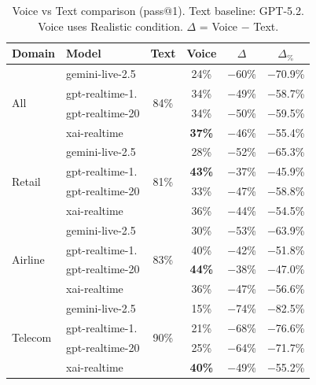 \begin{table}[h]
\caption{Voice vs Text comparison (pass@1). Text baseline: GPT-5.2. Voice uses Realistic condition. $\Delta$ = Voice $-$ Text.}
\label{tab:voice-vs-text}
\centering
\begin{small}
\begin{tabular}{@{}llcccc@{}}
\toprule
\textbf{Domain} & \textbf{Model} & \textbf{Text} & \textbf{Voice} & \textbf{$\Delta$} & \textbf{$\Delta_{\%}$} \\
\midrule
\multirow{4}{*}{All} & gemini-live-2.5 & \multirow{4}{*}{84\%} & 24\% & $-$60\% & $-$70.9\% \\
 & gpt-realtime-1. &  & 34\% & $-$49\% & $-$58.7\% \\
 & gpt-realtime-20 &  & 34\% & $-$50\% & $-$59.5\% \\
 & xai-realtime &  & \textbf{37\%} & $-$46\% & $-$55.4\% \\
\midrule
\multirow{4}{*}{Retail} & gemini-live-2.5 & \multirow{4}{*}{81\%} & 28\% & $-$52\% & $-$65.3\% \\
 & gpt-realtime-1. &  & \textbf{43\%} & $-$37\% & $-$45.9\% \\
 & gpt-realtime-20 &  & 33\% & $-$47\% & $-$58.8\% \\
 & xai-realtime &  & 36\% & $-$44\% & $-$54.5\% \\
\midrule
\multirow{4}{*}{Airline} & gemini-live-2.5 & \multirow{4}{*}{83\%} & 30\% & $-$53\% & $-$63.9\% \\
 & gpt-realtime-1. &  & 40\% & $-$42\% & $-$51.8\% \\
 & gpt-realtime-20 &  & \textbf{44\%} & $-$38\% & $-$47.0\% \\
 & xai-realtime &  & 36\% & $-$47\% & $-$56.6\% \\
\midrule
\multirow{4}{*}{Telecom} & gemini-live-2.5 & \multirow{4}{*}{90\%} & 15\% & $-$74\% & $-$82.5\% \\
 & gpt-realtime-1. &  & 21\% & $-$68\% & $-$76.6\% \\
 & gpt-realtime-20 &  & 25\% & $-$64\% & $-$71.7\% \\
 & xai-realtime &  & \textbf{40\%} & $-$49\% & $-$55.2\% \\
\bottomrule
\end{tabular}
\end{small}
\end{table}
